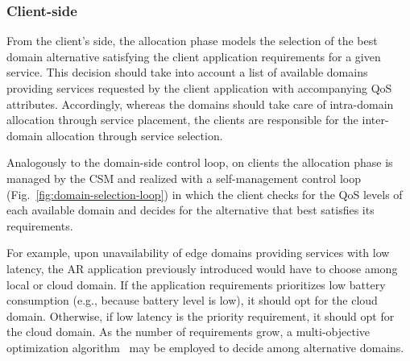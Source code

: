 

\subsubsection{Client-side} From the client's side, the allocation phase models the selection of the best domain alternative satisfying the client application requirements for a given service.
This decision should take into account a list of available domains providing services requested by the client application with accompanying QoS attributes. Accordingly, whereas the domains should take care of intra-domain allocation through service placement, the clients are responsible for the inter-domain allocation through service selection.

Analogously to the domain-side control loop, on clients the allocation phase is managed by the CSM  and realized with a self-management control loop (Fig.~\ref{fig:domain-selection-loop}) in which the client checks for the QoS levels of each available domain and decides for the alternative that best satisfies its requirements. 

For example, upon unavailability of edge domains providing services with low latency, the AR application previously introduced would have to choose among local or cloud domain. If the application requirements prioritizes low battery consumption (e.g., because battery level is low), it should opt for the cloud domain. Otherwise, if low latency is the priority requirement, it should opt for the cloud domain. As the number of requirements grow, a multi-objective optimization algorithm~\cite{Olson1996} may be employed to decide among alternative domains.






